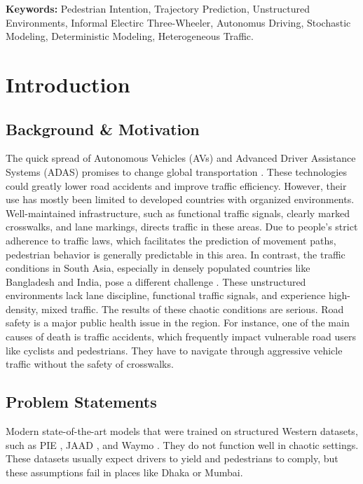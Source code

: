 \documentclass[12pt, a4paper]{article}
\begin{document}
	\textbf{Keywords:} Pedestrian Intention, Trajectory Prediction, Unstructured Environments, Informal Electirc Three-Wheeler, Autonomus Driving, Stochastic Modeling, Deterministic Modeling, Heterogeneous Traffic.

\newpage
\tableofcontents
\newpage

\listoffigures
\newpage
\listoftables
\newpage
{}
\setcounter{page}{6}


\section{Introduction}

\subsection{Background \& Motivation}

The quick spread of Autonomous Vehicles (AVs) and Advanced Driver Assistance Systems (ADAS) promises to change global transportation \cite{katyal2020intent}. These technologies could greatly lower road accidents and improve traffic efficiency. However, their use has mostly been limited to developed countries with organized environments. Well-maintained infrastructure, such as functional traffic signals, clearly marked crosswalks, and lane markings, directs traffic in these areas. Due to people's strict adherence to traffic laws, which facilitates the prediction of movement paths, pedestrian behavior is generally predictable in this area. In contrast, the traffic conditions in South Asia, especially in densely populated countries like Bangladesh and India, pose a different challenge \cite{parikh2024idd}. These unstructured environments lack lane discipline, functional traffic signals, and experience high-density, mixed traffic. The results of these chaotic conditions are serious. Road safety is a major public health issue in the region. For instance, one of the main causes of death is traffic accidents, which frequently impact vulnerable road users like cyclists and pedestrians. They have to navigate through aggressive vehicle traffic without the safety of crosswalks.


\subsection{Problem Statements}
Modern state-of-the-art models that were trained on structured Western datasets, such as PIE \cite{rasouli2019pie}, JAAD \cite{rasouli2017are}, and Waymo \cite{sun2020scalability}. They do not function well in chaotic settings. These datasets usually expect drivers to yield and pedestrians to comply, but these assumptions fail in places like Dhaka or Mumbai. 
\end{document}
